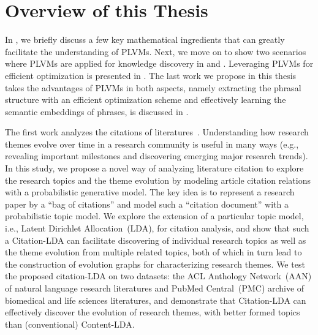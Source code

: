 \section{Overview of this Thesis}

In , we briefly discuss a few key mathematical ingredients that
can greatly facilitate the understanding of PLVMs. Next, we move on to show two
scenarios where PLVMs are applied for knowledge discovery in 
and . Leveraging PLVMs for efficient optimization is presented in
. The last work we propose in this thesis takes the advantages
of PLVMs in both aspects, namely extracting the phrasal structure with an
efficient optimization scheme and effectively learning the semantic embeddings
of phrases, is discussed in .

The first work analyzes the citations of
literatures~\cite{wang2013understanding}. Understanding how research themes
evolve over time in a research community is useful in many ways (e.g., revealing
important milestones and discovering emerging major research trends).  In this
study, we propose a novel way of analyzing literature citation to explore the
research topics and the theme evolution by modeling article citation relations
with a probabilistic generative model.  The key idea is to represent a research
paper by a ``bag of citations'' and model such a ``citation document'' with a
probabilistic topic model.  We explore the extension of a particular topic
model, i.e., Latent Dirichlet Allocation~(LDA), for citation analysis, and show
that such a Citation-LDA can facilitate discovering of individual research
topics as well as the theme evolution from multiple related topics, both of
which in turn lead to the construction of evolution graphs for characterizing
research themes.  We test the proposed citation-LDA on two datasets: the ACL
Anthology Network~(AAN) of natural language research literatures and PubMed
Central~(PMC) archive of biomedical and life sciences literatures, and
demonstrate that Citation-LDA can effectively discover the evolution of research
themes, with better formed topics than (conventional) Content-LDA.

